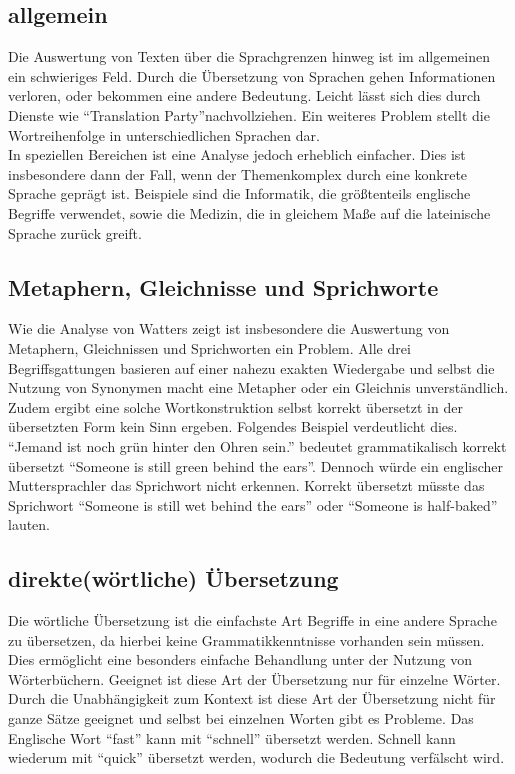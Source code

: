 \documentclass[twoside,a4paper]{article}
\begin{document}
\subsection{allgemein}
Die Auswertung von Texten über die Sprachgrenzen hinweg ist im allgemeinen ein schwieriges Feld. Durch die Übersetzung von Sprachen gehen Informationen verloren, oder bekommen eine andere Bedeutung. Leicht lässt sich dies durch Dienste wie \enquote{Translation Party}\footnotemark nachvollziehen. Ein weiteres Problem stellt die Wortreihenfolge in unterschiedlichen Sprachen dar.\\
In speziellen Bereichen ist eine Analyse jedoch erheblich einfacher. Dies ist insbesondere dann der Fall, wenn der Themenkomplex durch eine konkrete Sprache geprägt ist. Beispiele sind die Informatik, die größtenteils englische Begriffe verwendet, sowie die Medizin, die in gleichem Maße auf die lateinische Sprache zurück greift.\\


\subsection{Metaphern, Gleichnisse und Sprichworte}
\label{Metaphern}
Wie die Analyse von Watters zeigt ist insbesondere die Auswertung von Metaphern, Gleichnissen und Sprichworten ein Problem. Alle drei Begriffsgattungen basieren auf einer nahezu exakten Wiedergabe und selbst die Nutzung von Synonymen macht eine Metapher oder ein Gleichnis unverständlich. Zudem ergibt eine solche Wortkonstruktion selbst korrekt übersetzt in der übersetzten Form kein Sinn ergeben. Folgendes Beispiel verdeutlicht dies.\\
\enquote{Jemand ist noch grün hinter den Ohren sein.} bedeutet grammatikalisch korrekt übersetzt \enquote{Someone is still green behind the ears}. Dennoch würde ein englischer Muttersprachler das Sprichwort nicht erkennen. Korrekt übersetzt müsste das Sprichwort \enquote{Someone is still wet behind the ears} oder \enquote{Someone is half-baked} lauten.

\subsection{direkte(wörtliche) Übersetzung}
\label{direkteUebersetzung}
Die wörtliche Übersetzung ist die einfachste Art Begriffe in eine andere Sprache zu übersetzen, da hierbei keine Grammatikkenntnisse vorhanden sein müssen. Dies ermöglicht eine besonders einfache Behandlung unter der Nutzung von Wörterbüchern. Geeignet ist diese Art der Übersetzung nur für einzelne Wörter.\\
Durch die Unabhängigkeit zum Kontext ist diese Art der Übersetzung nicht für ganze Sätze geeignet und selbst bei einzelnen Worten gibt es Probleme. Das Englische Wort \enquote{fast} kann mit \enquote{schnell} übersetzt werden. Schnell kann wiederum mit \enquote{quick} übersetzt werden, wodurch die Bedeutung verfälscht wird.
\end{document}
